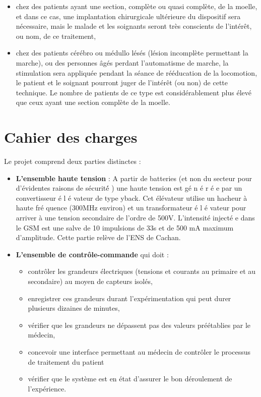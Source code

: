 \documentclass{report}
\begin{document}
\begin{itemize}
    \item  chez des patients ayant une section, compl\`ete ou quasi compl\`ete, de la moelle, et dans ce cas, une 
implantation chirurgicale ult\'erieure du dispositif sera n\'ecessaire, mais le malade et les soignants seront tr\`es 
conscients de l'int\'er\^et, ou nom, de ce traitement,

    \item chez des patients c\'er\'ebro ou m\'edullo l\'es\'es (l\'esion incompl\`ete permettant la marche), ou 
des personnes \^ag\'es perdant l'automatisme de marche, la stimulation sera appliqu\'ee pendant la s\'eance de 
r\'e\'education de la locomotion, le patient et le soignant pourront juger de l'int\'er\^et (ou non) de cette 
technique. Le nombre de patients de ce type est consid\'erablement plus \'elev\'e que ceux ayant une section compl\`ete 
de la moelle.

\end{itemize}


 
\section{Cahier des charges }

Le projet comprend deux parties distinctes : \\

\begin{itemize}
    \item \textbf{L'ensemble haute tension} : A partir de batteries (et non du secteur pour d'\'{e}videntes
raisons de s\'{e}curit\'{e}́ ) une haute tension est g\'{e} n \'{e} r \'{e} e par un convertisseur \'{e} l \'{e} vateur de
type yback. Cet \'{e}l\'{e}vateur utilise un hacheur \`{a} haute fr\'{e} quence (300MHz environ) et
un transformateur \'{e} l \'{e} vateur pour arriver \`{a} une tension secondaire de l'ordre de
500V. L'intensit\'{e} inject\'{e} e dans le GSM est une salve de 10 impulsions de 33\mu s et de
500 mA maximum d'amplitude. Cette partie rel\`{e}ve de l'ENS de Cachan.
    
    \item \textbf{L'ensemble de contr\^ole-commande} qui doit :
   
    \begin{itemize}
        \item contr\^oler les grandeurs \'electriques (tensions et courants au primaire et au secondaire) au moyen de 
capteurs isol\'es,
        \item enregistrer ces grandeurs durant l'exp\'erimentation qui peut durer plusieurs dizaines de minutes,
        \item v\'erifier que les grandeurs ne d\'epassent pas des valeurs pr\'e\'etablies par le m\'edecin,
        \item concevoir une interface permettant au m\'{e}decin de contrôler le processus de traitement du patient
        \item v\'erifier que le syst\`eme est en \'etat d'assurer le bon d\'eroulement de l'exp\'erience.
    \end{itemize}
\end{itemize}
\end{document}
